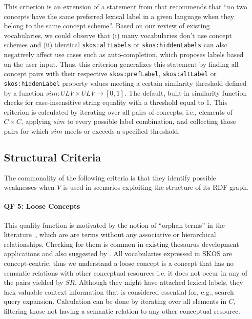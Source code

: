 This criterion is an extension of a statement from \cite{Isaac2009} that recommends that ``no two concepts have the same preferred lexical label in a given language when they belong to the same concept scheme''. Based on our review of existing vocabularies, we could observe that (i) many vocabularies don’t use concept schemes and (ii) identical \texttt{skos:altLabels} or \texttt{skos:hiddenLabels} can also negatively affect use cases such as auto-completion, which proposes labels based on the user input. Thus, this criterion generalizes this statement by finding all concept pairs with their respective \texttt{skos:prefLabel}, \texttt{skos:altLabel} or \texttt{skos:hiddenLabel} property values meeting a certain similarity threshold defined by a function $sim:ULV \times ULV \rightarrow [0,1]$. The default, built-in similarity function checks for case-insensitive string equality with a threshold equal to 1. This criterion is calculated by iterating over all pairs of concepts, i.e., elements of $C \times C$, applying $sim$ to every possible label combination, and collecting those pairs for which $sim$ meets or exceeds a specified threshold.  


\subsection{Structural Criteria}

The commonality of the following criteria is that they identify possible weaknesses when $V$ is used in scenarios exploiting the structure of its RDF graph. 

\paragraph{\textbf{QF 5: Loose Concepts}} 

This quality function is motivated by the notion of ``orphan terms'' in the literature~\cite{Hedden2010}, which are are terms without any associative or hierarchical relationships. Checking for them is common in existing thesaurus development applications and also suggested by \cite{Z39.19:2005}. All vocabularies expressed in SKOS are concept-centric, thus we understand a loose concept is a concept that has no semantic relations with other conceptual resources i.e. it does not occur in any of the pairs yielded by $SR$. Although they might have attached lexical labels, they lack valuable context information that is considered essential for, e.g., search query expansion. Calculation can be done by iterating over all elements in $C$, filtering those not having a semantic relation to any other conceptual resource. 

